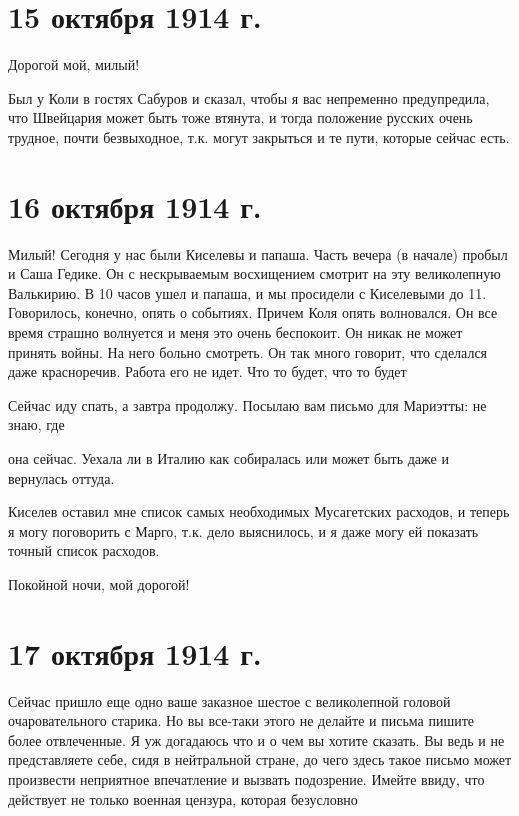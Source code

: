 \section{15 октября 1914 г.}


Дорогой мой, милый!

Был у Коли в гостях Сабуров и сказал, чтобы я вас непременно предупредила, что
Швейцария может быть тоже втянута, и тогда положение русских очень трудное,
почти безвыходное, т.к. могут закрыться и те пути, которые сейчас есть.

\section{16 октября 1914 г.}


Милый! Сегодня у нас были Киселевы и папаша. Часть вечера (в начале) пробыл и
Саша Гедике. Он с нескрываемым восхищением смотрит на эту великолепную
Валькирию. В 10 часов ушел и папаша, и мы просидели с Киселевыми до 11.
Говорилось, конечно, опять о событиях. Причем Коля опять волновался. Он все
время страшно волнуется и меня это очень беспокоит. Он никак не может принять
войны. На него больно смотреть. Он так много говорит, что сделался даже
красноречив. Работа его не идет. Что то будет, что то будет\textellipsis

Сейчас иду спать, а завтра продолжу. Посылаю вам письмо для Мариэтты: не знаю,
где


\noindent
она сейчас. Уехала ли в Италию как собиралась или может быть даже и вернулась
оттуда.

Киселев оставил мне список самых необходимых Мусагетских расходов, и теперь я
могу поговорить с Марго, т.к. дело выяснилось, и я даже могу ей показать точный
список расходов.

Покойной ночи, мой дорогой!

\section{17 октября 1914 г.}


Сейчас пришло еще одно ваше заказное шестое  с великолепной головой
очаровательного старика. Но вы все-таки этого не делайте и письма пишите более
отвлеченные. Я уж догадаюсь что и о чем вы хотите сказать. Вы ведь и не
представляете себе, сидя в нейтральной стране, до чего здесь такое письмо может
произвести неприятное впечатление и вызвать подозрение. Имейте ввиду, что
действует не только военная цензура, которая безусловно

